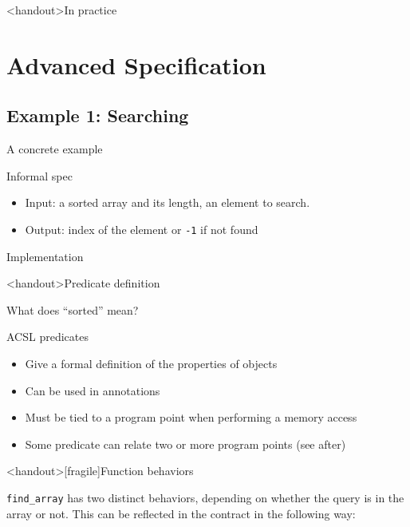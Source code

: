 \documentclass[pdf]{beamer}
\begin{document}
\begin{frame}<handout>{In practice}
\end{frame}

\section{Advanced Specification}
\subsection{Example 1: Searching}
\begin{frame}{A concrete example}
\begin{block}{Informal spec}
\begin{itemize}
\item Input: a \alert{sorted} array and its length, an element to search.
\item Output: index of the element or \texttt{-1} if not found
\end{itemize}
\end{block}
\begin{block}{Implementation}

\end{block}
\end{frame}

\begin{frame}<handout>{Predicate definition}
\begin{block}{What does ``sorted'' mean?}

\end{block}
\begin{block}{ACSL predicates}
\begin{itemize}
\item Give a formal definition of the properties of objects
\item Can be used in annotations
\item Must be tied to a program point when performing a memory access
\item Some predicate can relate two or more program points (see after)
\end{itemize}
\end{block}
\end{frame}

\begin{frame}<handout>[fragile]{Function behaviors}

\verb+find_array+ has two distinct \alert{behaviors}, depending on
whether the query is in the array or not. This can be reflected in the
contract in the following way:


\end{frame}
\end{document}
